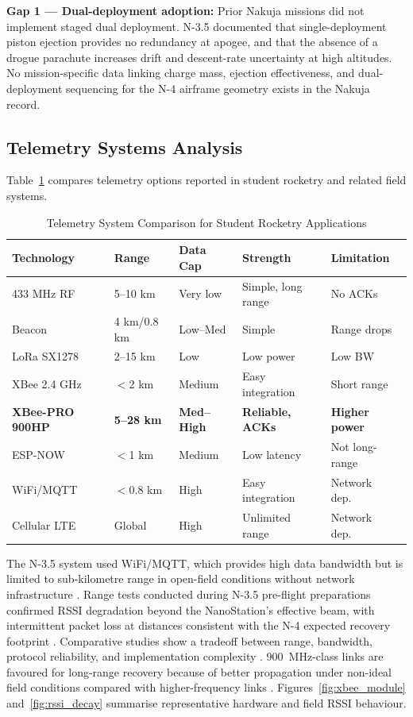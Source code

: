 \textbf{Gap 1 --- Dual-deployment adoption:} Prior Nakuja missions did not implement staged dual deployment. N-3.5 documented that single-deployment piston ejection provides no redundancy at apogee, and that the absence of a drogue parachute increases drift and descent-rate uncertainty at high altitudes. No mission-specific data linking charge mass, ejection effectiveness, and dual-deployment sequencing for the N-4 airframe geometry exists in the Nakuja record.

\subsection{Telemetry Systems Analysis}

Table~\ref{tab:telemetry} compares telemetry options reported in student rocketry and related field systems.

\begin{table}[htbp]
\centering
\caption{Telemetry System Comparison for Student Rocketry Applications}
\label{tab:telemetry}
\small
\renewcommand{\arraystretch}{1.1}
\begin{tabular}{@{}p{2.1cm}|p{1.8cm}|p{1.8cm}|p{2.8cm}|p{2.9cm}@{}}
\toprule
\rowcolor{gray!22}\textbf{Technology} & \textbf{Range} & \textbf{Data Cap} & \textbf{Strength} & \textbf{Limitation} \\ \midrule
433 MHz RF & 5--10 km & Very low & Simple, long range & No ACKs \\
Beacon & 4 km/0.8 km & Low--Med & Simple & Range drops \\
LoRa SX1278 & 2--15 km & Low & Low power & Low BW \\
XBee 2.4 GHz & $<$2 km & Medium & Easy integration & Short range \\
\textbf{XBee-PRO 900HP} & \textbf{5--28 km} & \textbf{Med--High} & \textbf{Reliable, ACKs} & \textbf{Higher power} \\
ESP-NOW & $<$1 km & Medium & Low latency & Not long-range \\
WiFi/MQTT & $<$0.8 km & High & Easy integration & Network dep.\ \\
Cellular LTE & Global & High & Unlimited range & Network dep.\ \\ \bottomrule
\end{tabular}
\end{table}

The N-3.5 system used WiFi/MQTT, which provides high data bandwidth but is limited to sub-kilometre range in open-field conditions without network infrastructure \cite{n3p5_recovery_report}. Range tests conducted during N-3.5 pre-flight preparations confirmed RSSI degradation beyond the NanoStation's effective beam, with intermittent packet loss at distances consistent with the N-4 expected recovery footprint \cite{n3p5_recovery_report}. Comparative studies show a tradeoff between range, bandwidth, protocol reliability, and implementation complexity \cite{telemetry_reliability}. 900~MHz-class links are favoured for long-range recovery because of better propagation under non-ideal field conditions compared with higher-frequency links \cite{xbee_manual}. Figures~\ref{fig:xbee_module} and~\ref{fig:rssi_decay} summarise representative hardware and field RSSI behaviour.

